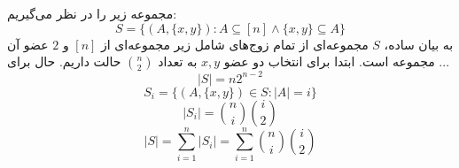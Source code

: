 \p
مجموعه زیر را در نظر می‌گیریم:
$$S = \{(A, \{x, y\}) : A  \subseteq [n] \wedge \{x, y\} \subseteq A \}$$
به بیان ساده، 
$S$
مجموعه‌ای از تمام زوج‌های شامل زیر مجموعه‌ای از
$[n]$
و
$2$
عضو آن مجموعه است.
ابتدا برای انتخاب دو عضو
$x, y$
به تعداد
$\binom{n}{2}$
حالت داریم.
حال برای ...
$$|S| = n2^{n-2}$$
$$S_i = \{(A, \{x, y\}) \in S: |A| = i\}$$
$$|S_i| = \binom{n}{i}\binom{i}{2}$$
$$|S| = \sum_{i=1}^{n}|S_i| = \sum_{i=1}^{n}\binom{n}{i} \binom{i}{2}$$